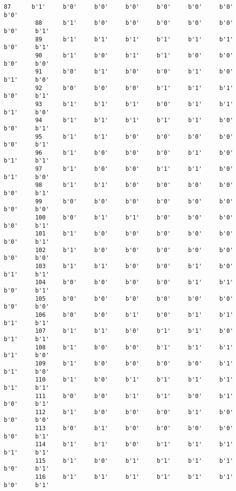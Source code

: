 \documentclass[11pt]{article}
\begin{document}
\begin{Verbatim}[commandchars=\\\{\}]
         87      b'1'     b'0'     b'0'     b'0'     b'0'     b'0'     b'0'     b'0'   
         88      b'1'     b'0'     b'0'     b'0'     b'0'     b'0'     b'0'     b'1'   
         89      b'1'     b'1'     b'1'     b'1'     b'1'     b'1'     b'0'     b'1'   
         90      b'1'     b'0'     b'1'     b'1'     b'0'     b'0'     b'0'     b'0'   
         91      b'0'     b'1'     b'0'     b'0'     b'1'     b'0'     b'1'     b'0'   
         92      b'0'     b'0'     b'0'     b'1'     b'1'     b'1'     b'0'     b'1'   
         93      b'1'     b'1'     b'1'     b'0'     b'1'     b'1'     b'1'     b'0'   
         94      b'1'     b'1'     b'1'     b'1'     b'1'     b'0'     b'0'     b'1'   
         95      b'1'     b'1'     b'0'     b'0'     b'0'     b'0'     b'0'     b'1'   
         96      b'1'     b'0'     b'0'     b'0'     b'1'     b'0'     b'1'     b'1'   
         97      b'1'     b'0'     b'0'     b'1'     b'1'     b'0'     b'1'     b'0'   
         98      b'1'     b'1'     b'0'     b'0'     b'0'     b'0'     b'0'     b'1'   
         99      b'0'     b'0'     b'0'     b'0'     b'0'     b'0'     b'0'     b'0'   
         100     b'0'     b'1'     b'1'     b'0'     b'0'     b'0'     b'0'     b'1'   
         101     b'1'     b'0'     b'0'     b'0'     b'0'     b'0'     b'0'     b'1'   
         102     b'1'     b'0'     b'0'     b'0'     b'0'     b'0'     b'0'     b'0'   
         103     b'1'     b'1'     b'0'     b'0'     b'1'     b'0'     b'1'     b'1'   
         104     b'0'     b'0'     b'0'     b'0'     b'1'     b'1'     b'0'     b'1'   
         105     b'0'     b'0'     b'0'     b'0'     b'0'     b'0'     b'0'     b'0'   
         106     b'0'     b'0'     b'1'     b'0'     b'1'     b'1'     b'1'     b'1'   
         107     b'1'     b'1'     b'0'     b'1'     b'1'     b'0'     b'1'     b'1'   
         108     b'1'     b'0'     b'0'     b'1'     b'1'     b'1'     b'1'     b'0'   
         109     b'1'     b'0'     b'0'     b'0'     b'0'     b'1'     b'1'     b'0'   
         110     b'1'     b'0'     b'1'     b'1'     b'1'     b'1'     b'1'     b'1'   
         111     b'0'     b'0'     b'1'     b'1'     b'0'     b'1'     b'0'     b'1'   
         112     b'1'     b'0'     b'0'     b'0'     b'1'     b'0'     b'0'     b'0'   
         113     b'0'     b'1'     b'0'     b'0'     b'0'     b'0'     b'0'     b'1'   
         114     b'1'     b'1'     b'0'     b'1'     b'1'     b'1'     b'1'     b'1'   
         115     b'1'     b'0'     b'1'     b'1'     b'1'     b'1'     b'0'     b'1'   
         116     b'1'     b'1'     b'1'     b'1'     b'1'     b'1'     b'0'     b'1'   

\end{Verbatim}
\end{document}
